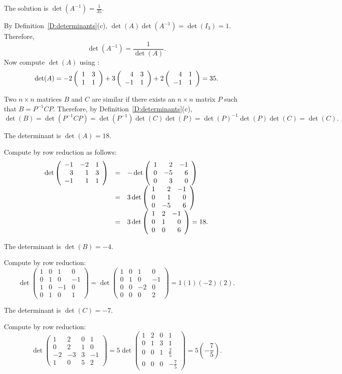\ans The solution is $\det(A^{-1}) = \frac{1}{35}$.

\soln By Definition~\ref{D:determinants}(c),
$\det(A)\det(A^{-1}) = \det(I_3) = 1$.  Therefore,
\[
\det(A^{-1}) = \frac{1}{\det(A)}.
\]
Now compute $\det(A)$ using :
\[
\det(A) = -2\left(\begin{array}{rr} 1 & 3\\ 1 &1\end{array}\right) + 3\left(\begin{array}{rr} 4 & 3\\ -1 &1\end{array}\right)
+ 2\left(\begin{array}{rr} 4 & 1\\ -1 &1\end{array}\right) = 35.
\]

Two $n \times n$ matrices $B$ and $C$ are similar if there exists
an $n \times n$ matrix $P$ such that $B = P^{-1}CP$.  Therefore, by
Definition~\ref{D:determinants}(c),
\[
\det(B) = \det(P^{-1}CP)
= \det(P^{-1})\det(C)\det(P)
= \det(P)^{-1}\det(P)\det(C)
= \det(C).
\]

\ans The determinant is $\det(A) = 18$. 

\soln Compute by row reduction as follows:
\[
\begin{array}{rcl}
\det\left(\begin{array}{rrr} -1 & -2 & 1 \\ 3 & 1 & 3 \\ -1 & 1 & 1\end{array}\right)
& = & -\det\left(\begin{array}{rrr} 1 & 2 & -1 \\ 0 & -5 & 6 \\ 0 & 3 & 0\end{array}\right) \\
& = & 3\det\left(\begin{array}{rrr} 1 & 2 & -1 \\ 0 & 1 & 0 \\ 0 & -5 & 6\end{array}\right) \\
& = & 3\det\left(\begin{array}{rrr} 1 & 2 & -1 \\ 0 & 1 & 0 \\ 0 & 0 & 6\end{array}\right) = 18.
\end{array}
\]

\ans The determinant is $\det(B) = -4$.

\soln Compute by row reduction:
\[
\det\left(\begin{array}{rrrr}
1 & 0 & 1 & 0 \\
0 & 1 & 0 & -1 \\
1 & 0 & -1 & 0 \\
0 & 1 & 0 & 1 \end{array}\right)
= \det\left(\begin{array}{rrrr}
1 & 0 & 1 & 0 \\
0 & 1 & 0 & -1 \\
0 & 0 & -2 & 0 \\
0 & 0 & 0 & 2 \end{array}\right)
= 1(1)(-2)(2).
\]

\ans The determinant is $\det(C) = -7$.

\soln Compute by row reduction:
\[
\det\left(\begin{array}{rrrr}
1 & 2 & 0 & 1 \\
0 & 2 & 1 & 0 \\
-2 & -3 & 3 & -1 \\
1 & 0 & 5 & 2 \end{array}\right)
= 5\det\left(\begin{array}{rrrr}
1 & 2 & 0 & 1 \\
0 & 1 & 3 & 1 \\
0 & 0 & 1 & \frac{2}{5} \\
0 & 0 & 0 & -\frac{7}{5} \end{array}\right)
= 5\left(-\frac{7}{5}\right).
\]

